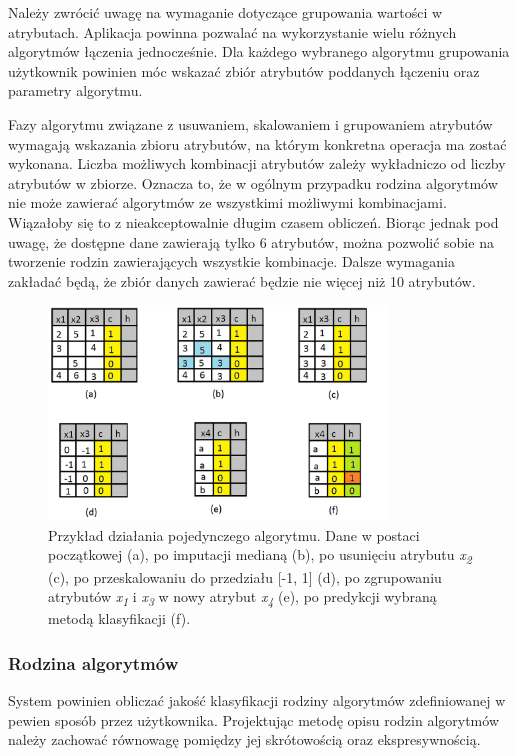 \documentclass[../thesis.tex]{subfiles}
\begin{document}
Należy zwrócić uwagę na wymaganie dotyczące grupowania wartości w atrybutach. Aplikacja powinna pozwalać na wykorzystanie wielu różnych algorytmów łączenia jednocześnie. Dla każdego wybranego algorytmu grupowania użytkownik powinien móc wskazać zbiór atrybutów poddanych łączeniu oraz parametry algorytmu.

Fazy algorytmu związane z usuwaniem, skalowaniem i grupowaniem atrybutów wymagają wskazania zbioru atrybutów, na którym konkretna operacja ma zostać wykonana. Liczba możliwych kombinacji atrybutów zależy wykładniczo od liczby atrybutów w zbiorze. Oznacza to, że w ogólnym przypadku rodzina algorytmów nie może zawierać algorytmów ze wszystkimi możliwymi kombinacjami. Wiązałoby się to z nieakceptowalnie długim czasem obliczeń. Biorąc jednak pod uwagę, że dostępne dane zawierają tylko 6 atrybutów, można pozwolić sobie na tworzenie rodzin zawierających wszystkie kombinacje. Dalsze wymagania zakładać będą, że zbiór danych zawierać będzie nie więcej niż 10 atrybutów.

\begin{figure}[h]
\centering
\includegraphics[width=0.8\textwidth]{algorithm.png}
\caption{Przykład działania pojedynczego algorytmu. Dane w postaci początkowej (a), po imputacji medianą (b), po usunięciu atrybutu \textit{x\textsubscript{2}} (c), po przeskalowaniu do przedziału [-1, 1] (d), po zgrupowaniu atrybutów \textit{x\textsubscript{1}} i \textit{x\textsubscript{3}} w nowy atrybut \textit{x\textsubscript{4}} (e), po predykcji wybraną metodą klasyfikacji (f).}
\label{req:algorithm}
\end{figure}

\subsubsection{Rodzina algorytmów}

System powinien obliczać jakość klasyfikacji rodziny algorytmów zdefiniowanej w pewien sposób przez użytkownika. Projektując metodę opisu rodzin algorytmów należy zachować równowagę pomiędzy jej skrótowością oraz ekspresywnością. 
\end{document}
